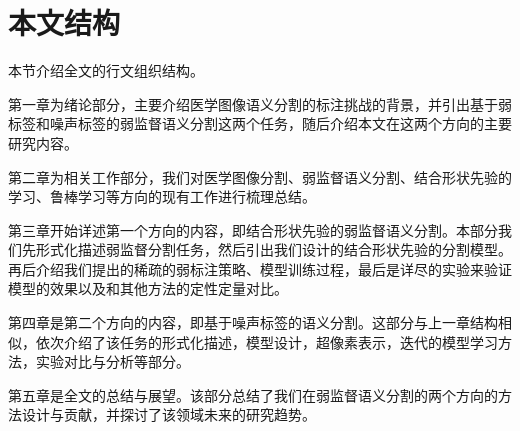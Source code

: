 \section{本文结构}
本节介绍全文的行文组织结构。

第一章为绪论部分，主要介绍医学图像语义分割的标注挑战的背景，并引出基于弱标签和噪声标签的弱监督语义分割这两个任务，随后介绍本文在这两个方向的主要研究内容。

第二章为相关工作部分，我们对医学图像分割、弱监督语义分割、结合形状先验的学习、鲁棒学习等方向的现有工作进行梳理总结。

第三章开始详述第一个方向的内容，即结合形状先验的弱监督语义分割。本部分我们先形式化描述弱监督分割任务，然后引出我们设计的结合形状先验的分割模型。再后介绍我们提出的稀疏的弱标注策略、模型训练过程，最后是详尽的实验来验证模型的效果以及和其他方法的定性定量对比。

第四章是第二个方向的内容，即基于噪声标签的语义分割。这部分与上一章结构相似，依次介绍了该任务的形式化描述，模型设计，超像素表示，迭代的模型学习方法，实验对比与分析等部分。

第五章是全文的总结与展望。该部分总结了我们在弱监督语义分割的两个方向的方法设计与贡献，并探讨了该领域未来的研究趋势。